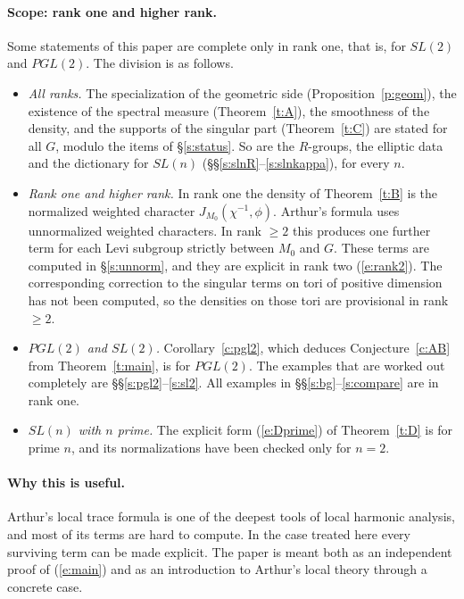 \documentclass[12pt,letterpaper]{article}
\numberwithin{equation}{section}
\theoremstyle{plain}
\theoremstyle{definition}
\theoremstyle{remark}
\begin{document}
\paragraph{Scope: rank one and higher rank.} Some statements of this paper are complete only in rank one, that is, for $SL(2)$ and $PGL(2)$. The division is as follows.
\begin{itemize}
\item \emph{All ranks.} The specialization of the geometric side (Proposition~\ref{p:geom}), the existence of the spectral measure (Theorem~\ref{t:A}), the smoothness of the density, and the supports of the singular part (Theorem~\ref{t:C}) are stated for all $G$, modulo the items of \S\ref{s:status}. So are the $R$-groups, the elliptic data and the dictionary for $SL(n)$ (\S\S\ref{s:slnR}--\ref{s:slnkappa}), for every $n$.
\item \emph{Rank one and higher rank.} In rank one the density of Theorem~\ref{t:B} is the normalized weighted character $J_{M_0}(\chi^{-1},\phi)$. Arthur's formula uses unnormalized weighted characters. In rank $\ge2$ this produces one further term for each Levi subgroup strictly between $M_0$ and $G$. These terms are computed in \S\ref{s:unnorm}, and they are explicit in rank two (\ref{e:rank2}). The corresponding correction to the singular terms on tori of positive dimension has not been computed, so the densities on those tori are provisional in rank $\ge2$.
\item \emph{$PGL(2)$ and $SL(2)$.} Corollary~\ref{c:pgl2}, which deduces Conjecture~\ref{c:AB} from Theorem~\ref{t:main}, is for $PGL(2)$. The examples that are worked out completely are \S\S\ref{s:pgl2}--\ref{s:sl2}. All examples in \S\S\ref{s:bg}--\ref{s:compare} are in rank one.
\item \emph{$SL(n)$ with $n$ prime.} The explicit form (\ref{e:Dprime}) of Theorem~\ref{t:D} is for prime $n$, and its normalizations have been checked only for $n=2$.
\end{itemize}

\paragraph{Why this is useful.} Arthur's local trace formula is one of the deepest tools of local harmonic analysis, and most of its terms are hard to compute. In the case treated here every surviving term can be made explicit. The paper is meant both as an independent proof of (\ref{e:main}) and as an introduction to Arthur's local theory through a concrete case.
\end{document}
